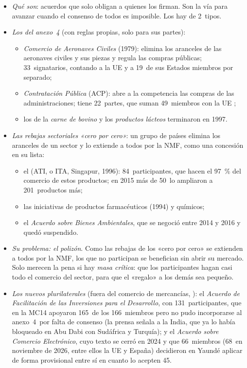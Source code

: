 \documentclass[11pt]{article}
\begin{document}
\begin{itemize}
\item \emph{Qué son}: acuerdos que solo obligan a quienes los firman. Son la vía para avanzar cuando el consenso de todos es imposible. Los hay de 2~tipos.
\item \emph{Los del anexo~4} (con reglas propias, solo para sus partes):
  \begin{itemize}
  \item \emph{Comercio de Aeronaves Civiles} (1979): elimina los aranceles de las aeronaves civiles y sus piezas y regula las compras públicas; 33~signatarios, contando a la UE y a 19~de sus Estados miembros por separado\nocite{OMC2026AeronavesCiviles};
  \item \emph{Contratación Pública} (ACP): abre a la competencia las compras de las administraciones; tiene 22~partes, que suman 49~miembros con la UE ;
  \item los de la \emph{carne de bovino} y los \emph{productos lácteos} terminaron en 1997.
  \end{itemize}
\item \emph{Las rebajas sectoriales «cero por cero»}: un grupo de países elimina los aranceles de un sector y lo extiende a todos por la NMF, como una concesión en su lista:
  \begin{itemize}
  \item el  (ATI, o ITA, Singapur, 1996): 84~participantes, que hacen el 97~\% del comercio de estos productos; en 2015 más de 50~lo ampliaron a 201~productos más\nocite{OMC2026ATI};
  \item las iniciativas de productos farmacéuticos (1994) y químicos;
  \item el \emph{Acuerdo sobre Bienes Ambientales}, que se negoció entre 2014 y 2016 y quedó suspendido.
  \end{itemize}
\item \emph{Su problema: el polizón}. Como las rebajas de los «cero por cero» se extienden a todos por la NMF, los que no participan se benefician sin abrir su mercado. Solo merecen la pena si hay \emph{masa crítica}: que los participantes hagan casi todo el comercio del sector, para que el «regalo» a los demás sea pequeño.
\item \emph{Los nuevos plurilaterales} (fuera del comercio de mercancías, ): el \emph{Acuerdo de Facilitación de las Inversiones para el Desarrollo}, con 131~participantes, que en la MC14 apoyaron 165~de los 166~miembros pero no pudo incorporarse al anexo~4~por falta de consenso (la prensa señala a la India, que ya lo había bloqueado en Abu Dabi con Sudáfrica y Turquía)\nocite{OMC2026IFD}; y el \emph{Acuerdo sobre Comercio Electrónico}, cuyo texto se cerró en 2024 y que 66~miembros (68~en noviembre de 2026, entre ellos la UE y España) decidieron en Yaundé aplicar de forma provisional entre sí en cuanto lo acepten 45\nocite{OMC2026ComercioElectronico}.
\end{itemize}
\end{document}
